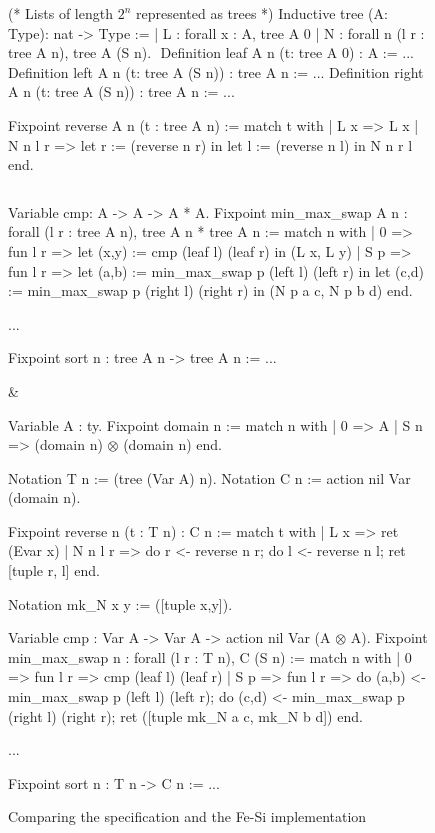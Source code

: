 \documentclass{llncs}
\begin{document}
\begin{figure}
  \centering
\begin{twolistings}
\begin{coq}
(* Lists of length $2^n$ represented as trees *)
Inductive tree (A: Type): nat -> Type :=
| L : forall x : A, tree A 0
| N : forall n (l r : tree A n), tree A (S n). 
$ $
Definition leaf  {A n} (t: tree A 0) : A := ...
Definition left  {A n} (t: tree A (S n)) : tree A n := ...
Definition right {A n} (t: tree A (S n)) : tree A n := ...

Fixpoint reverse {A} n (t : tree A n) :=
match t with 
| L x => L x
| N n l r => 
  let r := (reverse n r) in 
  let l := (reverse n l) in 
  N n r l
end.

$ $

Variable cmp: A -> A -> A * A.
Fixpoint min_max_swap {A} n : 
  forall (l r : tree A n), tree A n * tree A n :=
match n with 
| 0 => fun l r => 
  let (x,y) := cmp (leaf l) (leaf r) in (L x, L y)
| S p => fun l r => 
  let (a,b) := min_max_swap p (left l) (left r) in 
  let (c,d) := min_max_swap p (right l) (right r) in 
  (N p a c, N p b d)
end. 

...

Fixpoint sort n : tree A n -> tree A n := ...
\end{coq}
& $\quad$
\begin{coq}
Variable A : ty.        
Fixpoint domain n := match n with 
| 0 => A
| S n => (domain n) $\otimes$ (domain n)
end. 

Notation T n := (tree (Var A) n). 
Notation C n := action nil Var (domain n). 

Fixpoint reverse n (t : T n) : C n  :=
match t with 
| L x => ret (Evar x)
| N n l r => 
  do r <- reverse n r;
  do l <- reverse n l;
  ret [tuple r, l]
end.

Notation mk_N x y := ([tuple x,y]).

Variable cmp : Var A -> Var A -> action nil Var (A $\otimes$ A).
Fixpoint min_max_swap n : 
  forall (l r : T n), C (S n) :=
match n  with 
| 0 => fun l r => 
  cmp (leaf l) (leaf r)
| S p => fun l r => 
  do (a,b) <- min_max_swap p (left l) (left r);
  do (c,d) <- min_max_swap p (right l) (right r); 
  ret ([tuple mk_N a c, mk_N b d])
end.

...

Fixpoint sort n : T n -> C n := ...
\end{coq}
\end{twolistings}
  
  \caption{Comparing the specification and the Fe-Si implementation}
  \label{fig:reverse}
\end{figure}
\end{document}
